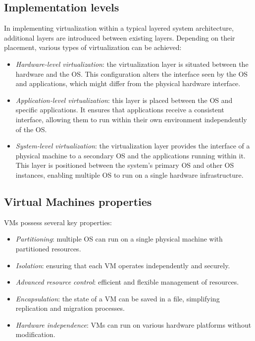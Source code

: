 \subsection{Implementation levels}
In implementing virtualization within a typical layered system architecture, additional layers are introduced between existing layers. 
Depending on their placement, various types of virtualization can be achieved:
\begin{itemize}
    \item \textit{Hardware-level virtualization}: the virtualization layer is situated between the hardware and the OS.
        This configuration alters the interface seen by the OS and applications, which might differ from the physical hardware interface.
    \item \textit{Application-level virtualization}: this layer is placed between the OS and specific applications.
        It ensures that applications receive a consistent interface, allowing them to run within their own environment independently of the OS.
    \item \textit{System-level virtualization}: the virtualization layer provides the interface of a physical machine to a secondary OS and the applications running within it.
        This layer is positioned between the system's primary OS and other OS instances, enabling multiple OS to run on a single hardware infrastructure.
\end{itemize}

\subsection{Virtual Machines properties}
VMs possess several key properties:
\begin{itemize}
    \item \textit{Partitioning}: multiple OS can run on a single physical machine with partitioned resources.
    \item \textit{Isolation}: ensuring that each VM operates independently and securely.
    \item \textit{Advanced resource control}: efficient and flexible management of resources.
    \item \textit{Encapsulation}: the state of a VM can be saved in a file, simplifying replication and migration processes.
    \item \textit{Hardware independence}: VMs can run on various hardware platforms without modification.
\end{itemize}

